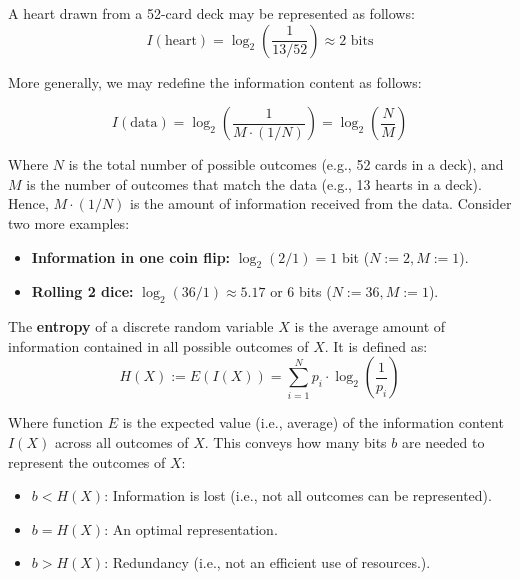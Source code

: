 \newpage 

\begin{Example}

    \label{ex:card_info_content}

    A heart drawn from a 52-card deck may be represented as follows:
    \[I(\text{heart}) = \log_2\left(\dfrac{1}{13/52}\right) \approx 2 \text{ bits}\]

    \noindent
    More generally, we may redefine the information content as follows:

    \[
        I(\text{data}) = \log_2\left(\dfrac{1}{M \cdot (1/N)}\right) = \log_2 \left(\dfrac{N}{M}\right)
    \]

    \noindent
    Where $N$ is the total number of possible outcomes (e.g., 52 cards in a deck), and $M$ is the number of outcomes that match 
    the data (e.g., 13 hearts in a deck). Hence, $M\cdot (1/N)$ is the amount of information received from the data. Consider two more examples:
    \begin{itemize}
        \item \textbf{Information in one coin flip:} $\log_2\left(2/1\right) = 1$ bit ($N:=2, M:=1$).
        \item \textbf{Rolling 2 dice:} $\log_2\left(36/1\right) \approx 5.17$ or 6 bits ($N:=36, M:=1$).
    \end{itemize}
\end{Example}

\begin{Def}[Entropy]

    \label{def:entropy}

    The \textbf{entropy} of a discrete random variable $X$ is the average amount of information contained in all possible outcomes of $X$.
    It is defined as:
    \Large
    \[
    H(X) := E(I(X)) = \sum_{i=1}^{N} p_i \cdot \log_2\left(\dfrac{1}{p_i}\right)
    \]

    \normalsize
    \noindent
    Where function $E$ is the expected value (i.e., average) of the information content $I(X)$ across all outcomes of $X$.
    This conveys how many bits $b$ are needed to represent the outcomes of $X$:
    \begin{itemize}
        \item $b < H(X)$: Information is lost (i.e., not all outcomes can be represented).
        \item $b = H(X)$: An optimal representation.
        \item $b > H(X)$: Redundancy (i.e., not an efficient use of resources.).
    \end{itemize}
\end{Def}

